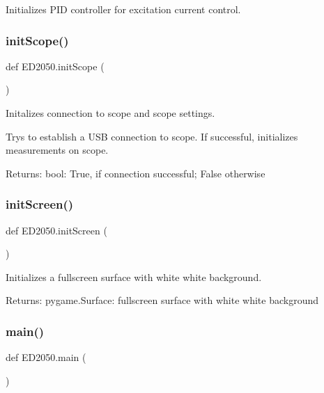 \begin{DoxyVerb}Initializes PID controller for excitation current control.
\end{DoxyVerb}
 \mbox{\label{namespaceED2050_a348653b636181ae8ffcddc1577b44397}} 
\subsubsection{\texorpdfstring{init\+Scope()}{initScope()}}
{\footnotesize\ttfamily def E\+D2050.\+init\+Scope (\begin{DoxyParamCaption}{ }\end{DoxyParamCaption})}

\begin{DoxyVerb}Initalizes connection to scope and scope settings.

Trys to establish a USB connection to scope. If successful, initializes
measurements on scope.

Returns:
    bool: True, if connection successful; False otherwise
\end{DoxyVerb}
 \mbox{\label{namespaceED2050_aafd6a3a6c52b44017db2d0cc7d608e5d}} 
\subsubsection{\texorpdfstring{init\+Screen()}{initScreen()}}
{\footnotesize\ttfamily def E\+D2050.\+init\+Screen (\begin{DoxyParamCaption}{ }\end{DoxyParamCaption})}

\begin{DoxyVerb}Initializes a fullscreen surface with white white background.

Returns:
    pygame.Surface: fullscreen surface with white white background
\end{DoxyVerb}
 \mbox{\label{namespaceED2050_a27554b34bcc2a830b18d75fa02939bc7}} 
\subsubsection{\texorpdfstring{main()}{main()}}
{\footnotesize\ttfamily def E\+D2050.\+main (\begin{DoxyParamCaption}{ }\end{DoxyParamCaption})}


